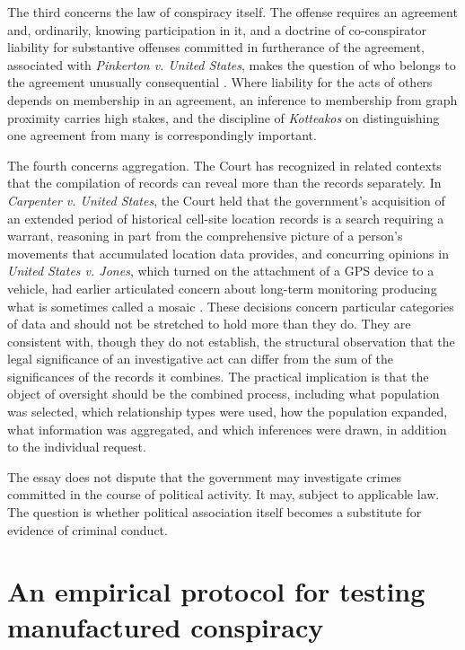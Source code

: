 \documentclass[11pt]{article}
\theoremstyle{definition}
\theoremstyle{remark}
\begin{document}
The third concerns the law of conspiracy itself. The offense requires an agreement and, ordinarily, knowing participation in it, and a doctrine of co-conspirator liability for substantive offenses committed in furtherance of the agreement, associated with \emph{Pinkerton v. United States}, makes the question of who belongs to the agreement unusually consequential \cite{pinkerton1946}. Where liability for the acts of others depends on membership in an agreement, an inference to membership from graph proximity carries high stakes, and the discipline of \emph{Kotteakos} on distinguishing one agreement from many is correspondingly important.

The fourth concerns aggregation. The Court has recognized in related contexts that the compilation of records can reveal more than the records separately. In \emph{Carpenter v. United States}, the Court held that the government's acquisition of an extended period of historical cell-site location records is a search requiring a warrant, reasoning in part from the comprehensive picture of a person's movements that accumulated location data provides, and concurring opinions in \emph{United States v. Jones}, which turned on the attachment of a GPS device to a vehicle, had earlier articulated concern about long-term monitoring producing what is sometimes called a mosaic \cite{carpenter2018,jones2012}. These decisions concern particular categories of data and should not be stretched to hold more than they do. They are consistent with, though they do not establish, the structural observation that the legal significance of an investigative act can differ from the sum of the significances of the records it combines. The practical implication is that the object of oversight should be the combined process, including what population was selected, which relationship types were used, how the population expanded, what information was aggregated, and which inferences were drawn, in addition to the individual request. 

The essay does not dispute that the government may investigate crimes committed in the course of political activity. It may, subject to applicable law. The question is whether political association itself becomes a substitute for evidence of criminal conduct.

\section{An empirical protocol for testing manufactured conspiracy}
\end{document}
